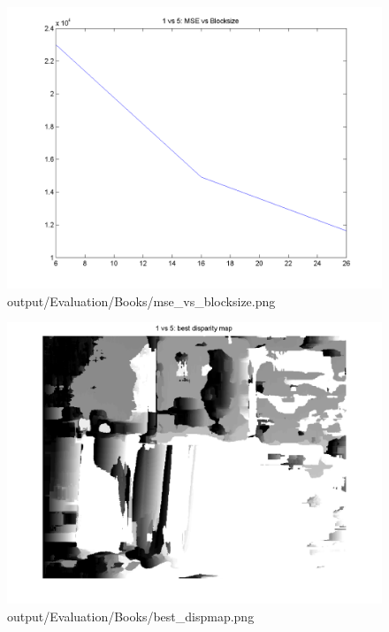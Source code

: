 \begin{figure}[h]    \includegraphics[scale=0.5]{output/Evaluation/Books/mse_vs_blocksize.png}    \caption{output/Evaluation/Books/mse\_vs\_blocksize.png}\end{figure}
\begin{figure}[h]    \includegraphics[scale=0.5]{output/Evaluation/Books/best_dispmap.png}    \caption{output/Evaluation/Books/best\_dispmap.png}\end{figure}
